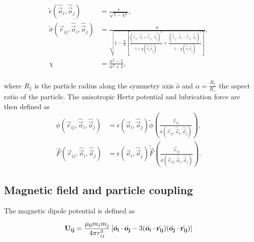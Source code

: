 \begin{equation}
    \begin{split}
    \tilde\epsilon\left(\hat{\vec{o}}_i, \hat{\vec{o}}_j\right) &= \frac{{\epsilon}}{\sqrt{1-\chi^2}} , \\
    \tilde\sigma\left(\vec{r}_{ij}, \hat{\vec{o}}_i, \hat{\vec{o}}_j\right) &= \frac{{\sigma}}{\sqrt{1-\frac{\chi}{2}\left[ \frac{\left(\hat{\vec{r}}_{ij}\cdot\hat{\vec{o}}_i+\hat{\vec{r}}_{ij}\cdot\hat{\vec{o}}_j\right)^2}{1+\chi\left(\hat{\vec{o}}_i\hat{\vec{o}}_j\right)} + \frac{\left(\hat{\vec{r}}_{ij}\cdot\hat{\vec{o}}_i-\hat{\vec{r}}_{ij}\cdot\hat{\vec{o}}_j\right)^2}{1-\chi\left(\hat{\vec{o}}_i\hat{\vec{o}}_j\right)} \right] }} , \\
    \chi &= \frac{\alpha^2-1}{\alpha^2+1} , \\
    \end{split}
\end{equation}

where $R_{\parallel}$ is the particle radius along the
symmetry axis $\hat{o}$ and $\alpha=\frac{R_{\parallel}}{R_{\perp}}$ the aspect
ratio of the particle. The anisotropic Hertz potential and lubrication
force are then defined as
%
\begin{equation}
    \begin{split}
    \phi\left(\vec{r}_{ij}, \hat{\vec{o}}_i, \hat{\vec{o}}_j\right) &= \epsilon\left(\hat{\vec{o}}_i, \hat{\vec{o}}_j\right) \tilde{\phi}\left(\frac{\vec{r}_{ij}}{\sigma\left(\vec{r}_{ij}, \hat{\vec{o}}_i, \hat{\vec{o}}_j\right)} \right) , \\
    \vec{F}\left(\vec{r}_{ij}, \hat{\vec{o}}_i, \hat{\vec{o}}_j\right) &= \epsilon\left(\hat{\vec{o}}_i, \hat{\vec{o}}_j\right) \tilde{\vec{F}}\left(\frac{\vec{r}_{ij}}{\sigma\left(\vec{r}_{ij}, \hat{\vec{o}}_i, \hat{\vec{o}}_j\right)} \right) .
    \end{split}
\end{equation}

\subsection{Magnetic field and particle coupling}
\label{section:lbm_colloids_magnetics}

The magnetic dipole potential is defined as

\begin{equation}
    \mathbf{U_{ij}} = \frac{\mu_0 m_i m_j}{4\pi r_{ij}^{3}} \left[ \Hat{\mathbf{o_i}} \cdot \Hat{\mathbf{o_j}} - 
    3(\Hat{\mathbf{o_i}} \cdot \Hat{\mathbf{r_{ij}}})(\Hat{\mathbf{o_j}} \cdot \Hat{\mathbf{r_{ij}}}) \right]
    \label{eq:magnet_potential}
\end{equation}


